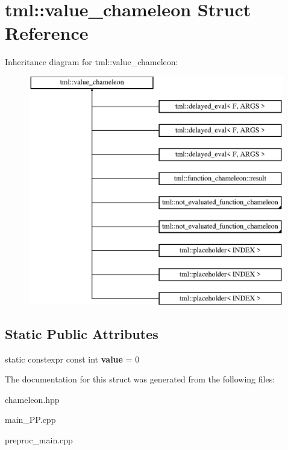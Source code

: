 \hypertarget{structtml_1_1value__chameleon}{\section{tml\+:\+:value\+\_\+chameleon Struct Reference}
\label{structtml_1_1value__chameleon}
}
Inheritance diagram for tml\+:\+:value\+\_\+chameleon\+:\begin{figure}[H]
\begin{center}
\leavevmode
\includegraphics[height=10.000000cm]{structtml_1_1value__chameleon}
\end{center}
\end{figure}
\subsection*{Static Public Attributes}
\begin{DoxyCompactItemize}
\item 
\hypertarget{structtml_1_1value__chameleon_a130c17b5b0d5c015dea90f3e93182a63}{static constexpr const int {\bfseries value} = 0}\label{structtml_1_1value__chameleon_a130c17b5b0d5c015dea90f3e93182a63}

\end{DoxyCompactItemize}


The documentation for this struct was generated from the following files\+:\begin{DoxyCompactItemize}
\item 
chameleon.\+hpp\item 
main\+\_\+\+P\+P.\+cpp\item 
preproc\+\_\+main.\+cpp\end{DoxyCompactItemize}
